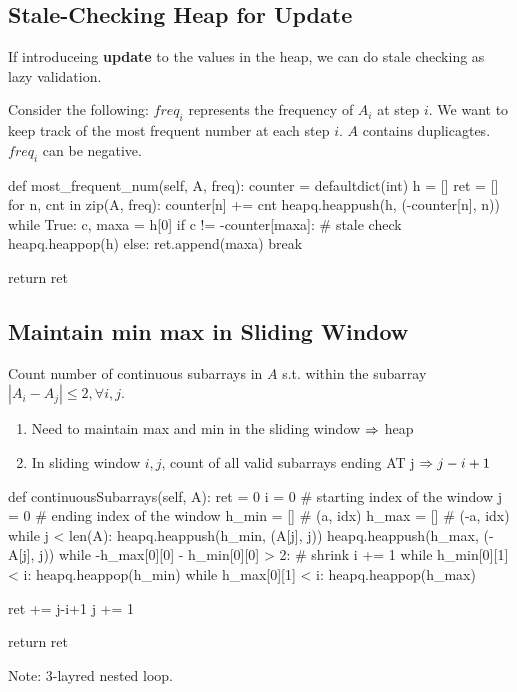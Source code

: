 \subsection{Stale-Checking Heap for Update}
If introduceing \textbf{update} to the values in the heap, we can do stale checking as lazy validation.

Consider the following: $freq_i$ represents the frequency of $A_i$ at step $i$. We want to keep track of the most frequent number at each step $i$. $A$ contains duplicagtes. $freq_i$ can be negative. 
\begin{python}
def most_frequent_num(self, A, freq):
    counter = defaultdict(int)
    h = []
    ret = []
    for n, cnt in zip(A, freq):
        counter[n] += cnt
        heapq.heappush(h, (-counter[n], n))
        while True:
            c, maxa = h[0]
            if c != -counter[maxa]:  # stale check
                heapq.heappop(h)
            else:
                ret.append(maxa)
                break
    
    return ret
\end{python}

\subsection{Maintain min max in Sliding Window}
Count number of continuous subarrays in $A$ s.t. within the subarray $|A_i - A_j| \leq 2, \forall i, j$.
\begin{enumerate}
\item Need to maintain max and min in the sliding window $\Rightarrow$ heap
\item In sliding window $i, j$, count of all valid subarrays ending AT j $\Rightarrow j - i + 1$ 
\end{enumerate}
\begin{python}
def continuousSubarrays(self, A):
    ret = 0
    i = 0  # starting index of the window
    j = 0  # ending index of the window
    h_min = []  # (a, idx)
    h_max = []  # (-a, idx)
    while j < len(A):
        heapq.heappush(h_min, (A[j], j))
        heapq.heappush(h_max, (-A[j], j))
        while -h_max[0][0] - h_min[0][0] > 2:
            # shrink
            i += 1
            while h_min[0][1] < i:
                heapq.heappop(h_min)
            while h_max[0][1] < i:
                heapq.heappop(h_max)
        
        ret += j-i+1
        j += 1
    
    return ret
\end{python}
Note: 3-layred nested  loop.

